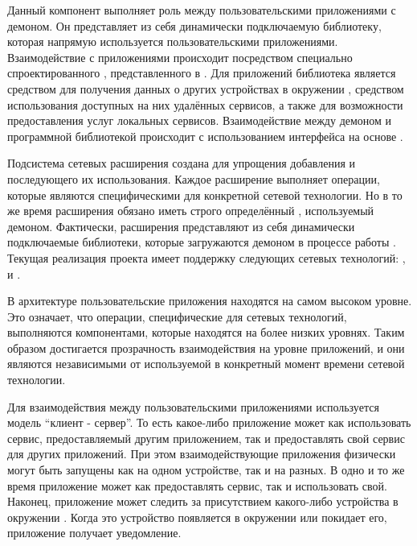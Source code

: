 %
Данный компонент выполняет роль  между пользовательскими приложениями с демоном.
%
Он представляет из себя динамически подключаемую библиотеку, которая напрямую используется пользовательскими приложениями.
%
Взаимодействие с приложениями происходит посредством специально спроектированного , представленного в .
%
Для приложений библиотека является средством для получения данных о других устройствах в окружении , средством использования доступных на них удалённых сервисов, а также для возможности предоставления услуг локальных сервисов.
%
Взаимодействие между демоном и программной библиотекой происходит с использованием интерфейса на основе  .

%
Подсистема сетевых расширения создана для упрощения добавления  и последующего их использования.
%
Каждое расширение выполняет операции, которые являются специфическими для конкретной сетевой технологии.
%
Но в то же время расширения обязано иметь строго определённый , используемый демоном.
%
Фактически, расширения представляют из себя динамически подключаемые библиотеки, которые загружаются демоном в процессе работы .
%
Текущая реализация проекта имеет поддержку следующих сетевых технологий:  ,   и  .

%
В архитектуре  пользовательские приложения находятся на самом высоком уровне.
%
Это означает, что операции, специфические для сетевых технологий, выполняются компонентами, которые находятся на более низких уровнях.
%
Таким образом достигается прозрачность взаимодействия на уровне приложений, и они являются независимыми от используемой в конкретный момент времени сетевой технологии.

%
Для взаимодействия между пользовательскими приложениями используется модель ``клиент - сервер''.
%
То есть какое-либо приложение может как использовать сервис, предоставляемый другим приложением, так и предоставлять свой сервис для других приложений. 
%
При этом взаимодействующие приложения физически могут быть запущены как на одном устройстве, так и на разных. 
%
В одно и то же время приложение может как предоставлять сервис, так и использовать свой.
%
Наконец, приложение может следить за присутствием какого-либо устройства в окружении .
%
Когда это устройство появляется в окружении или покидает его, приложение получает уведомление.
